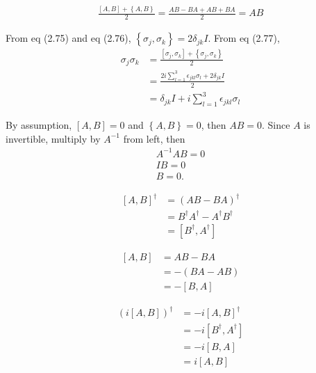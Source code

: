 \begin{align*}
	\frac{\left[A, B \right] + \left\{A, B\right\}}{2} = \frac{AB - BA + AB + BA}{2} = AB
\end{align*}




From eq (2.75) and eq (2.76), $\left\{\sigma_j,  \sigma_k \right\} = 2 \delta_{jk} I$.
From eq (2.77),
\begin{align*}
	\sigma_j \sigma_k &= \frac{\left[\sigma_j, \sigma_k  \right] + \left\{\sigma_j, \sigma_k \right\}}{2}\\
		&= \frac{2i \sum_{l=1}^{3} \epsilon_{jkl}\sigma_l +  2 \delta_{jk} I}{2}\\
		&= \delta_{jk} I + i \sum_{l=1}^{3} \epsilon_{jkl}\sigma_l
\end{align*}



By assumption, $\left[A, B\right] = 0$ and $\left\{A, B\right\} = 0$, then $AB = 0$.
Since $A$ is invertible, multiply by $A^{-1}$ from left, then
\begin{align*}
	A^{-1} AB = 0\\
	IB = 0\\
	B=0.
\end{align*}


\begin{align*}
	\left[A, B\right]^\dagger &= (AB -BA)^\dagger\\
		&= B^\dagger A^\dagger - A^\dagger B^\dagger\\
		&= \left[B^\dagger, A^\dagger \right]
\end{align*}



\begin{align*}
	\left[A, B\right] &= AB - BA\\
		&= - (BA - AB)\\
		&= -\left[B, A\right]
\end{align*}



\begin{align*}
	\left(i \left[A, B\right] \right)^\dagger &= -i \left[A, B\right]^\dagger\\
		&= -i \left[B^\dagger, A^\dagger \right]\\
		&= -i \left[B, A \right]\\
		&= i \left[A, B\right]
\end{align*}



